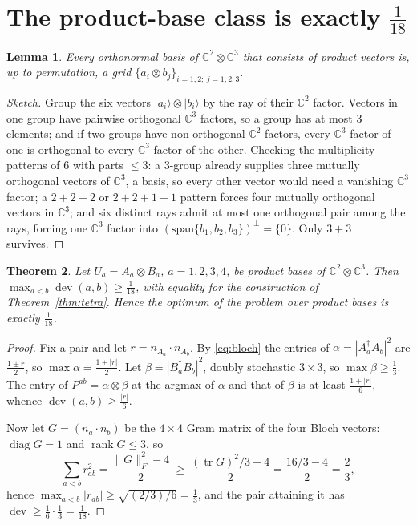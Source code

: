 \documentclass[11pt,a4paper]{article}
\newtheorem{theorem}{Theorem}[section]
\newtheorem{lemma}[theorem]{Lemma}
\theoremstyle{remark}
\newcommand{\C}{\mathbb{C}}
\newcommand{\dev}{\operatorname{dev}}
\DeclareMathOperator{\tr}{tr}
\begin{document}
\section{The product-base class is exactly $\tfrac1{18}$}
\label{sec:product}

\begin{lemma}\label{lem:grid}
Every orthonormal basis of $\C^2\otimes\C^3$ that consists of product vectors is, up to
permutation, a grid $\{a_i\otimes b_j\}_{i=1,2;\ j=1,2,3}$.
\end{lemma}
\begin{proof}[Sketch]
Group the six vectors $|a_i\rangle\otimes|b_i\rangle$ by the ray of their $\C^2$ factor.
Vectors in one group have pairwise orthogonal $\C^3$ factors, so a group has at most $3$
elements; and if two groups have non-orthogonal $\C^2$ factors, every $\C^3$ factor of one is
orthogonal to every $\C^3$ factor of the other.  Checking the multiplicity patterns of $6$
with parts $\le3$: a $3$-group already supplies three mutually orthogonal vectors of $\C^3$, a
basis, so every other vector would need a vanishing $\C^3$ factor; a $2+2+2$ or $2+2+1+1$
pattern forces four mutually orthogonal vectors in $\C^3$; and six distinct rays admit at most
one orthogonal pair among the rays, forcing one $\C^3$ factor into
$(\mathrm{span}\{b_1,b_2,b_3\})^\perp=\{0\}$.  Only $3+3$ survives.
\end{proof}

\begin{theorem}\label{thm:product}
Let $U_a=A_a\otimes B_a$, $a=1,2,3,4$, be product bases of $\C^2\otimes\C^3$.  Then
$\max_{a<b}\dev(a,b)\ge\tfrac1{18}$, with equality for the construction of
Theorem~\ref{thm:tetra}.  Hence the optimum of the problem over product bases is exactly
$\tfrac1{18}$.
\end{theorem}
\begin{proof}
Fix a pair and let $r=n_{A_a}\cdot n_{A_b}$.  By \eqref{eq:bloch} the entries of
$\alpha=|A_a^\dagger A_b|^2$ are $\tfrac{1\pm r}{2}$, so $\max\alpha=\tfrac{1+|r|}{2}$.  Let
$\beta=|B_a^\dagger B_b|^2$, doubly stochastic $3\times3$, so $\max\beta\ge\tfrac13$.  The
entry of $P^{ab}=\alpha\otimes\beta$ at the argmax of $\alpha$ and that of $\beta$ is at least
$\tfrac{1+|r|}{6}$, whence $\dev(a,b)\ge\tfrac{|r|}{6}$.

Now let $G=(n_a\cdot n_b)$ be the $4\times4$ Gram matrix of the four Bloch vectors:
$\operatorname{diag}G=1$ and $\operatorname{rank}G\le3$, so
\[
\sum_{a<b}r_{ab}^2=\frac{\|G\|_F^2-4}{2}\ \ge\ \frac{(\tr G)^2/3-4}{2}=\frac{16/3-4}{2}=\frac23,
\]
hence $\max_{a<b}|r_{ab}|\ge\sqrt{(2/3)/6}=\tfrac13$, and the pair attaining it has
$\dev\ge\tfrac16\cdot\tfrac13=\tfrac1{18}$.
\end{proof}
\end{document}
